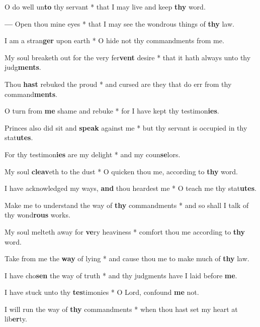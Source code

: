 \begin{multicols}{2}
	O do well un\textbf{to} thy servant * that I may live and keep \textbf{thy} word.
	
	\textbf{---} Open thou mine eyes * that I may see the wondrous things of \textbf{thy} law.
	
	I am a stran\textbf{ger} upon earth * O hide not thy commandments from me.
	
	My soul breaketh out for the very fer\textbf{vent} desire * that it hath always unto thy judg\textbf{ments}.
	
	Thou \textbf{hast} rebuked the proud * and cursed are they that do err from thy command\textbf{ments}.
	
	O turn from \textbf{me} shame and rebuke * for I have kept thy testimon\textbf{ies}.
	
	Princes also did sit and \textbf{speak} against me * but thy servant is occupied in thy stat\textbf{utes}.
	
	For thy testimon\textbf{ies} are my delight * and my coun\textbf{se}lors.
	
	My soul \textbf{cleav}eth to the dust * O quicken thou me, according to \textbf{thy} word.
	
	I have acknowledged my ways, \textbf{and} thou heardest me * O teach me thy stat\textbf{utes}.
	
	Make me to understand the way of \textbf{thy} commandments * and so shall I talk of thy wond\textbf{rous} works.
	
	My soul melteth away for \textbf{ve}ry heaviness * comfort thou me according to \textbf{thy} word.
	
	Take from me the \textbf{way} of lying * and cause thou me to make much of \textbf{thy} law.
	
	I have cho\textbf{sen} the way of truth * and thy judgments have I laid before \textbf{me}.
	
	I have stuck unto thy \textbf{tes}timonies * O Lord, confound \textbf{me} not.
	
	I will run the way of \textbf{thy} commandments * when thou hast set my heart at lib\textbf{er}ty.
\end{multicols}